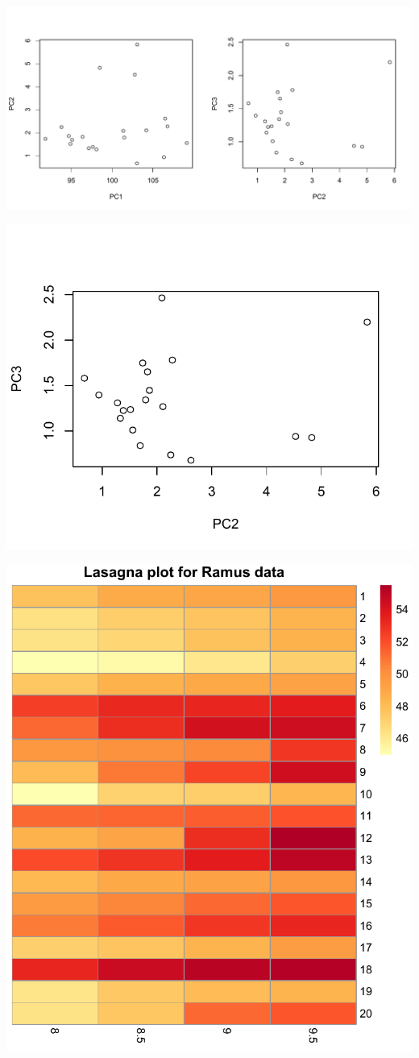 \documentclass[
  9pt,
  ignorenonframetext,
]{beamer}
\begin{document}
\begin{frame}{}
\protect\hypertarget{section-15}{}
\tiny

\begin{center}\includegraphics[width=0.6\linewidth]{figs_L2/prcomp plot-1} \end{center}

\begin{center}\includegraphics[width=0.6\linewidth]{figs_L2/prcomp plot-2} \end{center}

\tiny
\end{frame}

\begin{frame}{}
\protect\hypertarget{section-16}{}
\tiny

\begin{center}\includegraphics[width=0.6\linewidth]{figs_L2/unnamed-chunk-9-1} \end{center}

\tiny
\end{frame}
\end{document}
